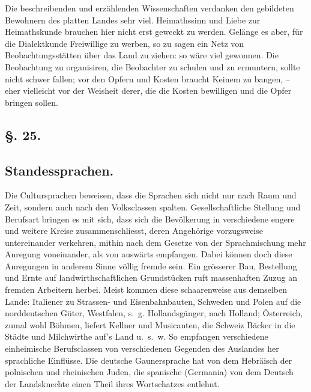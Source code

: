 {Die beschreibenden und erzählenden Wissenschaften verdanken den gebildeten Bewohnern des platten Landes sehr viel. Heimathssinn und Liebe zur Heimathskunde brauchen hier nicht erst geweckt zu werden. Gelänge es aber, für die Dialektkunde Freiwillige zu werben, so zu sagen ein Netz von Beobachtungsstätten über das Land zu ziehen: so wäre viel gewonnen. Die Beobachtung zu organisiren, die Beobachter zu schulen und zu ermuntern, sollte nicht schwer fallen; vor den Opfern und Kosten braucht Keinem zu bangen, – eher vielleicht vor der Weisheit derer, die die Kosten bewilligen und die Opfer bringen sollen.

\label{sp.288}

\subsection*{§. 25.}\label{III.II.II.25}
\subsection*{Standessprachen.}
Die Cultursprachen beweisen, dass die Sprachen sich nicht nur nach Raum und Zeit, sondern auch nach den Volksclassen spalten. Gesell\-\label{fp.282}schaftliche Stellung und Berufsart bringen es mit sich, dass sich die Bevölkerung in verschiedene engere und weitere Kreise zusammenschliesst, deren Angehörige vorzugsweise untereinander verkehren, mithin nach dem Gesetze von der Sprachmischung mehr Anregung voneinander, als von auswärts empfangen. Dabei können doch diese Anregungen in anderem Sinne völlig fremde sein. Ein grösserer Bau, Bestellung und Ernte auf landwirthschaftlichen Grundstücken ruft massenhaften Zuzug an fremden Arbeitern herbei. Meist kommen diese schaarenweise aus demselben Lande: Italiener zu Strassen- und Eisenbahnbauten, Schweden und Polen auf die norddeutschen Güter, Westfalen, s.~g. Hollandsgänger, nach Holland; Österreich, zumal wohl Böhmen, liefert Kellner und Musicanten, die Schweiz Bäcker in die Städte und Milchwirthe auf’s Land u.~s.~w. So empfangen verschiedene einheimische Berufsclassen von verschiedenen Gegenden des Auslandes her sprachliche Einflüsse. Die deutsche Gaunersprache hat von dem Hebräisch der polnischen und rheinischen Juden, die spanische (Germania) von dem Deutsch der Landsknechte einen Theil ihres Wortschatzes entlehnt.

}
